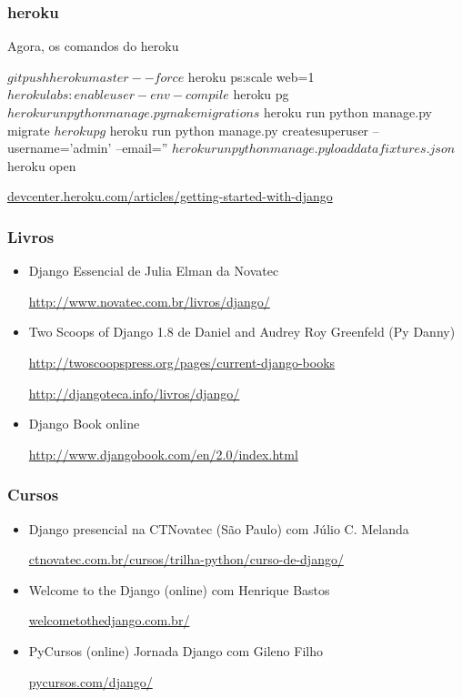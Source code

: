 \documentclass[aspectratio=169]{beamer}
\begin{document}
\begin{frame}[fragile]\frametitle{heroku}
	
Agora, os comandos do heroku

\begin{bashcode}
$ git push heroku master --force
$ heroku ps:scale web=1
$ heroku labs:enable user-env-compile
$ heroku pg
$ heroku run python manage.py makemigrations
$ heroku run python manage.py migrate
$ heroku pg
$ heroku run python manage.py createsuperuser --username='admin' --email=''
$ heroku run python manage.py loaddata fixtures.json
$ heroku open
\end{bashcode}

\vfill

\url{devcenter.heroku.com/articles/getting-started-with-django}

\end{frame}

\begin{frame}[fragile]\frametitle{Livros}

\begin{itemize}

	\item Django Essencial de Julia Elman da Novatec

\url{http://www.novatec.com.br/livros/django/}

	\item Two Scoops of Django 1.8 de Daniel and Audrey Roy Greenfeld (Py Danny)

\url{http://twoscoopspress.org/pages/current-django-books}


\url{http://djangoteca.info/livros/django/}

	\item Django Book online

\url{http://www.djangobook.com/en/2.0/index.html}


\end{itemize}

\end{frame}

\begin{frame}[fragile]\frametitle{Cursos}

\begin{itemize}

	\item Django presencial na CTNovatec (S\~ao Paulo) com J\'ulio C. Melanda

	\url{ctnovatec.com.br/cursos/trilha-python/curso-de-django/}

	\item Welcome to the Django (online) com Henrique Bastos

	\url{welcometothedjango.com.br/}

	\item PyCursos (online) Jornada Django com Gileno Filho

	\url{pycursos.com/django/}

\end{itemize}


\end{frame}
\end{document}

